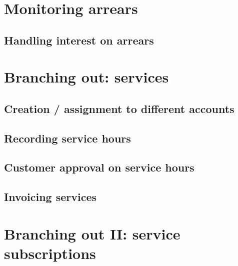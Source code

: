 \chapter{Monitoring arrears}
\label{cha-starting-monitoring-arrears}

\section{Handling interest on arrears}
\label{sec-monitoring-interest-on-arrears}



\chapter{Branching out: services}
\label{cha-starting-branch-to-services}

\section{Creation / assignment to different accounts}
\label{sec-starting-services-assignment}

\section{Recording service hours}
\label{sec-starting-services-writing-hours}

\section{Customer approval on service hours}
\label{sec-starting-services-hours-customer-approval}

\section{Invoicing services}
\label{sec-starting-services-invoicing}

\chapter{Branching out II: service subscriptions}
\label{cha-starting-services-subscriptions}

